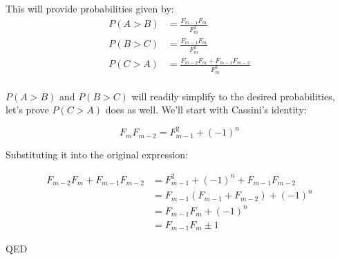 \documentclass[10pt]{book}
\begin{document}
This will provide probabilities given by:
\begin{align*}
P(A>B)&=\frac{F_{m-1}F_{m}}{F_m^2}\\
P(B>C)&=\frac{F_{m-1}F_{m}}{F_m^2}\\
P(C>A)&=\frac{F_{m-2}F_{m}+F_{m-1}F_{m-2}}{F_m^2}\\
\end{align*}

$P(A>B)$ and $P(B>C)$ will readily simplify to the desired probabilities, let's prove $P(C>A)$ does as well. We'll start with Cassini's identity:

$$F_mF_{m-2}=F_{m-1}^2+(-1)^n$$

Substituting it into the original expression:

\begin{align*}
F_{m-2}F_{m}+F_{m-1}F_{m-2}&=F_{m-1}^2+(-1)^n+F_{m-1}F_{m-2}\\
&=F_{m-1}(F_{m-1}+F_{m-2})+(-1)^n\\
&=F_{m-1}F_m+(-1)^n\\
&=F_{m-1}F_m\pm 1
\end{align*}

QED
\end{document}
